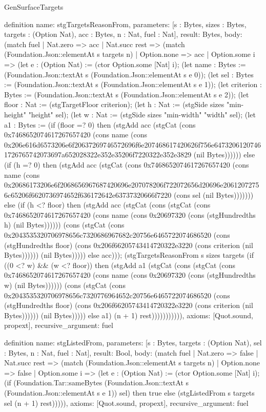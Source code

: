 \begin{lexlean}{GenSurfaceTargets}
\begin{semanticmodule}
definition{
  name: stgTargetsReasonFrom,
  parameters: [s : Bytes, sizes : Bytes, targets : (Option Nat), acc : Bytes, n : Nat, fuel : Nat],
  result: Bytes,
  body: (match fuel
    | Nat.zero => acc
    | Nat.succ rest => (match (Foundation.Json::elementAt s targets n)
      | Option.none => acc
      | Option.some i => (let e : (Option Nat) := (ctor Option.some [Nat] i); (let name : Bytes := (Foundation.Json::textAt s (Foundation.Json::elementAt s e 0)); (let sel : Bytes := (Foundation.Json::textAt s (Foundation.Json::elementAt s e 1)); (let criterion : Bytes := (Foundation.Json::textAt s (Foundation.Json::elementAt s e 2)); (let floor : Nat := (stgTargetFloor criterion); (let h : Nat := (stgSide sizes "min-height" "height" sel); (let w : Nat := (stgSide sizes "min-width" "width" sel); (let a1 : Bytes := (if (floor =? 0) then (stgAdd acc (stgCat (cons 0x7468652074617267657420 (cons name (cons 0x206e616d6573206e6f20637269746572696f6e207468617420626f756e64732061207461726765742073697a652028322e352e35206f7220322e352e3829 (nil Bytes)))))) else (if (h =? 0) then (stgAdd acc (stgCat (cons 0x7468652074617267657420 (cons name (cons 0x20686173206e6f2068656967687420696e207078206f722072656d20696e20612072756c65206f6620736974652f636172642e63737320666f7220 (cons sel (nil Bytes))))))) else (if (h <? floor) then (stgAdd acc (stgCat (cons (stgCat (cons 0x7468652074617267657420 (cons name (cons 0x20697320 (cons (stgHundredths h) (nil Bytes)))))) (cons (stgCat (cons 0x2043535320706978656c7320686967682c20756e6465722074686520 (cons (stgHundredths floor) (cons 0x206f66205743414720322e3220 (cons criterion (nil Bytes)))))) (nil Bytes))))) else acc))); (stgTargetsReasonFrom s sizes targets (if ((0 <? w) && (w <? floor)) then (stgAdd a1 (stgCat (cons (stgCat (cons 0x7468652074617267657420 (cons name (cons 0x20697320 (cons (stgHundredths w) (nil Bytes)))))) (cons (stgCat (cons 0x2043535320706978656c7320776964652c20756e6465722074686520 (cons (stgHundredths floor) (cons 0x206f66205743414720322e3220 (cons criterion (nil Bytes)))))) (nil Bytes))))) else a1) (n + 1) rest))))))))))),
  axioms: [Quot.sound, propext],
  recursive_argument: fuel
}

definition{
  name: stgListedFrom,
  parameters: [s : Bytes, targets : (Option Nat), sel : Bytes, n : Nat, fuel : Nat],
  result: Bool,
  body: (match fuel
    | Nat.zero => false
    | Nat.succ rest => (match (Foundation.Json::elementAt s targets n)
      | Option.none => false
      | Option.some i => (let e : (Option Nat) := (ctor Option.some [Nat] i); (if (Foundation.Tar::sameBytes (Foundation.Json::textAt s (Foundation.Json::elementAt s e 1)) sel) then true else (stgListedFrom s targets sel (n + 1) rest))))),
  axioms: [Quot.sound, propext],
  recursive_argument: fuel
}


\end{semanticmodule}
\end{lexlean}
